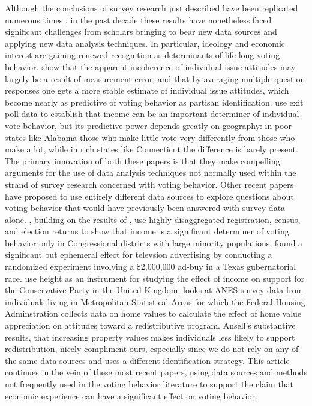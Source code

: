Although the conclusions of survey research just described have been replicated numerous times \parencite{Nie1976,Smith989,LewisBeck2008}, in the past decade these results have nonetheless faced significant challenges from scholars bringing to bear new data sources and applying new data analysis techniques. In particular, ideology and economic interest are gaining renewed recognition as determinants of life-long voting behavior. \textcite{Ansolabehere2008} show that the apparent incoherence of individual issue attitudes may largely be a result of measurement error, and that by averaging multiple question responses one gets a more stable estimate of individual issue attitudes, which become nearly as predictive of voting behavior as partisan identification.  \textcite{Gelman2007} use exit poll data to establish that income can be an important determiner of individual vote behavior, but its predictive power depends greatly on geography: in poor states like Alabama those who make little vote very differently from those who make a lot, while in rich states like Connecticut the difference is barely present. The primary innovation of both these papers is that they make compelling arguments for the use of data analysis techniques not normally used within the strand of survey research concerned with voting behavior.  Other recent papers have proposed to use entirely different data sources to explore questions about voting behavior that would have previously been answered with survey data alone. \textcite{Hersh2015}, building on the results of \textcite{Gelman2007}, use highly disaggregated registration, census, and election returns to show that income is a significant determiner of voting behavior only in Congressional districts with large minority populations. \textcite{Gerber2011} found a significant but ephemeral effect for televsion advertising by conducting a randomized experiment involving a \$2,000,000 ad-buy in a Texas gubernatorial race. \citeauthor{Arunchalam} use height as an instrument for studying the effect of income on support for the Conservative Party in the United Kingdom. \textcite{Ansell2014} looks at ANES survey data from individuals living in Metropolitan Statistical Areas for which the Federal Housing Adminstration collects data on home values to calculate the effect of home value appreciation on attitudes toward a redistributive program. Ansell's substantive results, that increasing property values makes individuals less likely to support redistribution, nicely compliment ours, especially since we do not rely on any of the same data sources and uses a different identification strategy.  This article continues in the vein of these most recent papers, using data sources and methods not frequently used in the voting behavior literature to support the claim that economic experience can have a significant effect on voting behavior. 

